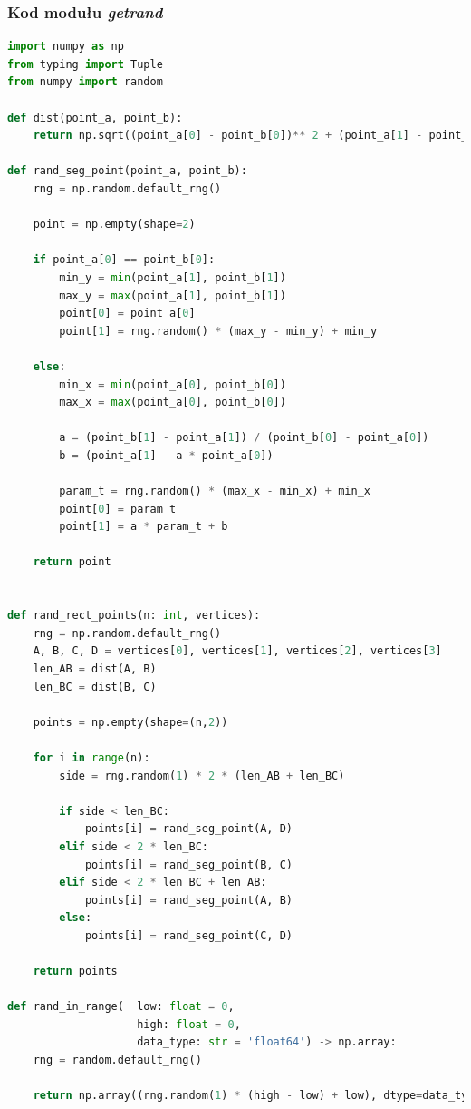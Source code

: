 \documentclass[11pt]{article}
\theoremstyle{remark} \newtheorem{definition}{def.}
\theoremstyle{definition} \newtheorem{twierdzenie}{tw.}
\begin{document}
\subsubsection*{Kod modułu \emph{getrand}}
\begin{lstlisting}[language=Python]
import numpy as np
from typing import Tuple
from numpy import random

def dist(point_a, point_b):
    return np.sqrt((point_a[0] - point_b[0])** 2 + (point_a[1] - point_b[1])**2)

def rand_seg_point(point_a, point_b):
    rng = np.random.default_rng()
    
    point = np.empty(shape=2)
    
    if point_a[0] == point_b[0]:
        min_y = min(point_a[1], point_b[1])
        max_y = max(point_a[1], point_b[1])
        point[0] = point_a[0]
        point[1] = rng.random() * (max_y - min_y) + min_y
        
    else:
        min_x = min(point_a[0], point_b[0])
        max_x = max(point_a[0], point_b[0])
        
        a = (point_b[1] - point_a[1]) / (point_b[0] - point_a[0])
        b = (point_a[1] - a * point_a[0])
        
        param_t = rng.random() * (max_x - min_x) + min_x
        point[0] = param_t
        point[1] = a * param_t + b
         
    return point
        

def rand_rect_points(n: int, vertices):
    rng = np.random.default_rng()
    A, B, C, D = vertices[0], vertices[1], vertices[2], vertices[3]
    len_AB = dist(A, B)
    len_BC = dist(B, C)
    
    points = np.empty(shape=(n,2))
    
    for i in range(n):
        side = rng.random(1) * 2 * (len_AB + len_BC)
    
        if side < len_BC:
            points[i] = rand_seg_point(A, D)
        elif side < 2 * len_BC:
            points[i] = rand_seg_point(B, C)
        elif side < 2 * len_BC + len_AB:
            points[i] = rand_seg_point(A, B)
        else:
            points[i] = rand_seg_point(C, D)
    
    return points
    
def rand_in_range(  low: float = 0, 
                    high: float = 0, 
                    data_type: str = 'float64') -> np.array:
    rng = random.default_rng()

    return np.array((rng.random(1) * (high - low) + low), dtype=data_type)



\end{lstlisting}
\end{document}
